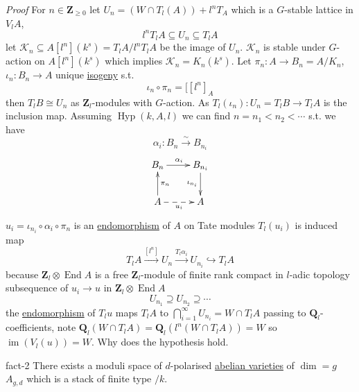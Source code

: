 \documentclass[10pt,]{book}
\makeatletter
\renewcommand*{\proofname}{Proof}
\renewenvironment{proof}[1][\proofname]{\par
  \pushQED{\qed}%
  \normalfont \topsep6\p@\@plus6\p@\relax
  \trivlist
  \item\relax
    {\itshape
    #1\@addpunct{.}}\hspace\labelsep\ignorespaces
}{%
  \popQED\endtrivlist\@endpefalse
}
\numberwithin{equation}{section}
\newcommand{\lb}{[}
\newcommand{\rb}{]}
\newcommand{\ZZ}{\mathbf{Z}}
\newcommand{\QQ}{\mathbf{Q}}
\DeclareMathOperator{\End}{End}
\DeclareMathOperator{\image}{im}
\newcommand{\lt}{<}
\makeatother
\begin{document}
\begin{proof}\hypertarget{proof-67}{}
\hypertarget{p-394}{}%
For \(n \in \ZZ_{\ge 0}\) let \(U_n = (W\cap T_l(A)) + l^n T_A\) which is a \(G\)-stable lattice in \(V_l A\),%
\begin{equation*}
l^nT_lA \subseteq U_n \subseteq T_l A
\end{equation*}
let \(\mathcal K_n \subseteq A\lb l^n \rb (k^s) = T_l A/ l^n T_l A\) be the image of \(U_n\). \(\mathcal K_n\) is stable under \(G\)-action on \(A\lb l^n \rb (k^s)\) which implies \(\mathcal K_n = K_n (k^s)\). Let \(\pi_n \colon A \to B_n = A/ K_n\), \(\iota_n \colon B_n \to A\) unique \hyperref[def-supersing-isog-isog]{isogeny} s.t.%
\begin{equation*}
\iota_n \circ \pi_n  =  \lb [l^n]_A
\end{equation*}
then \(T_lB \cong U_n\) as \(\ZZ_l\)-modules with \(G\)-action. As \(T_l(\iota_n) \colon U_n =T_l B  \to T_l A\) is the inclusion map. Assuming \(\operatorname{Hyp}(k,A,l)\) we can find \(n = n_1 \lt n_2 \lt \cdots\) s.t. we have%
\begin{equation*}
\alpha_i \colon B_n \xrightarrow{\sim} B_{n_i}
\end{equation*}
%
\begin{equation*}
\xymatrix{
B_n \ar[r]^{\alpha_i} & B_{n_i} \ar[d]_{\iota_{n_i}}\\
A\ar[u]_{\pi_n} \ar@{-->}_{u_i}[r] & A
}
\end{equation*}
\(u_i = \iota_{n_i} \circ \alpha_i \circ \pi_n\) is an \hyperref[def-supersing-isog-endo]{endomorphism} of \(A\) on Tate modules \(T_l(u_i)\) is induced map%
\begin{equation*}
T_l A \xrightarrow{[l^n]} U_n \xrightarrow{T_l\alpha_i} U_{n_i} \hookrightarrow T_l A
\end{equation*}
because \(\ZZ_l \otimes \End A\) is a free \(\ZZ_l\)-module of finite rank compact in \(l\)-adic topology subsequence of \(u_i \to u\) in \(\ZZ_l \otimes \End A\)%
\begin{equation*}
U_{n_1} \supseteq U_{n_2} \supseteq \cdots
\end{equation*}
the \hyperref[def-supersing-isog-endo]{endomorphism} of \(T_l u\) maps \(T_l A\) to \(\bigcap_{i=1}^\infty U_{n_i} = W\cap T_l A\) passing to \(\QQ_l\)-coefficients, note \(\QQ_l(W\cap T_l A) = \QQ_l(l^n(W\cap T_l A)) = W\) so \(\image(V_l(u)) =W\).%
\end{proof}
\hypertarget{p-395}{}%
Why does the hypothesis hold.%
\begin{fact}{}{}{fact-2}%
\hypertarget{p-396}{}%
There exists a moduli space of \(d\)-polarised \hyperref[def-buntes-abvar]{abelian varieties} of \(\dim = g\) \(A_{g,d}\) which is a stack of finite type \(/k\).%
\end{fact}
\end{document}
